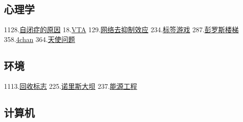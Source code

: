 \subsection{心理学}
1128.\href{https://wuli.wiki/assets/sogou/1128.\%E8\%87\%AA\%E9\%97\%AD\%E7\%97\%87\%E7\%9A\%84\%E5\%8E\%9F\%E5\%9B\%A0\%20-\%20\%E6\%90\%9C\%E7\%8B\%97\%E7\%A7\%91\%E5\%AD\%A6\%E7\%99\%BE\%E7\%A7\%91.html}{自闭症的原因}
18.\href{https://wuli.wiki/assets/sogou/18.VTA\%20-\%20\%E6\%90\%9C\%E7\%8B\%97\%E7\%A7\%91\%E5\%AD\%A6\%E7\%99\%BE\%E7\%A7\%91.html}{VTA}
129.\href{https://wuli.wiki/assets/sogou/129.\%E7\%BD\%91\%E7\%BB\%9C\%E5\%8E\%BB\%E6\%8A\%91\%E5\%88\%B6\%E6\%95\%88\%E5\%BA\%94\%20-\%20\%E6\%90\%9C\%E7\%8B\%97\%E7\%A7\%91\%E5\%AD\%A6\%E7\%99\%BE\%E7\%A7\%91.html}{网络去抑制效应}
234.\href{https://wuli.wiki/assets/sogou/234.\%E6\%A0\%87\%E7\%AD\%BE\%E6\%B8\%B8\%E6\%88\%8F\%20-\%20\%E6\%90\%9C\%E7\%8B\%97\%E7\%A7\%91\%E5\%AD\%A6\%E7\%99\%BE\%E7\%A7\%91.html}{标签游戏}
287.\href{https://wuli.wiki/assets/sogou/287.\%E5\%BD\%AD\%E7\%BD\%97\%E6\%96\%AF\%E6\%A5\%BC\%E6\%A2\%AF\%20-\%20\%E6\%90\%9C\%E7\%8B\%97\%E7\%A7\%91\%E5\%AD\%A6\%E7\%99\%BE\%E7\%A7\%91.html}{彭罗斯楼梯}
358.\href{https://wuli.wiki/assets/sogou/358.4chan\%20-\%20\%E6\%90\%9C\%E7\%8B\%97\%E7\%A7\%91\%E5\%AD\%A6\%E7\%99\%BE\%E7\%A7\%91.html}{4chan}
364.\href{https://wuli.wiki/assets/sogou/364.\%E5\%A4\%A9\%E4\%BD\%BF\%E9\%97\%AE\%E9\%A2\%98\%20-\%20\%E6\%90\%9C\%E7\%8B\%97\%E7\%A7\%91\%E5\%AD\%A6\%E7\%99\%BE\%E7\%A7\%91.html}{天使问题}

\subsection{环境}
1113.\href{https://wuli.wiki/assets/sogou/1113.\%E5\%9B\%9E\%E6\%94\%B6\%E6\%A0\%87\%E5\%BF\%97\%20-\%20\%E6\%90\%9C\%E7\%8B\%97\%E7\%A7\%91\%E5\%AD\%A6\%E7\%99\%BE\%E7\%A7\%91.html}{回收标志}
225.\href{https://wuli.wiki/assets/sogou/225.\%E8\%AF\%BA\%E9\%87\%8C\%E6\%96\%AF\%E5\%A4\%A7\%E5\%9D\%9D\%20-\%20\%E6\%90\%9C\%E7\%8B\%97\%E7\%A7\%91\%E5\%AD\%A6\%E7\%99\%BE\%E7\%A7\%91.html}{诺里斯大坝}
237.\href{https://wuli.wiki/assets/sogou/237.\%E8\%83\%BD\%E6\%BA\%90\%E5\%B7\%A5\%E7\%A8\%8B\%20-\%20\%E6\%90\%9C\%E7\%8B\%97\%E7\%A7\%91\%E5\%AD\%A6\%E7\%99\%BE\%E7\%A7\%91.html}{能源工程}

\subsection{计算机}
